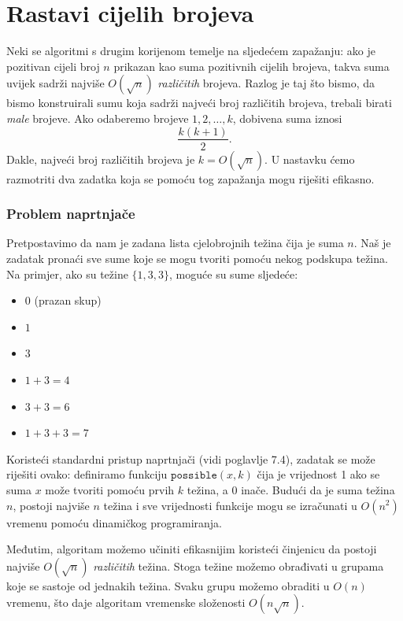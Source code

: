 \section{Rastavi cijelih brojeva}

Neki se algoritmi s drugim korijenom temelje na
sljedećem zapažanju:
ako je pozitivan cijeli broj $n$ prikazan kao
suma pozitivnih cijelih brojeva,
takva suma uvijek sadrži najviše
$O(\sqrt n)$ \emph{različitih} brojeva.
Razlog je taj što bismo, da bismo konstruirali
sumu koja sadrži najveći broj različitih
brojeva, trebali birati \emph{male} brojeve.
Ako odaberemo brojeve $1,2,\ldots,k$,
dobivena suma iznosi
\[\frac{k(k+1)}{2}.\]
Dakle, najveći broj različitih brojeva je $k = O(\sqrt n)$.
U nastavku ćemo razmotriti dva zadatka koja se pomoću tog
zapažanja mogu riješiti efikasno.

\subsubsection{Problem naprtnjače}

Pretpostavimo da nam je zadana lista cjelobrojnih težina
čija je suma $n$.
Naš je zadatak pronaći sve sume koje se mogu tvoriti
pomoću nekog podskupa težina. Na primjer, ako su težine
$\{1,3,3\}$, moguće su sume sljedeće:

\begin{itemize}[noitemsep]
\item $0$ (prazan skup)
\item $1$
\item $3$
\item $1+3=4$
\item $3+3=6$
\item $1+3+3=7$
\end{itemize}

Koristeći standardni pristup naprtnjači (vidi poglavlje 7.4),
zadatak se može riješiti ovako:
definiramo funkciju $\texttt{possible}(x,k)$ čija je vrijednost 1
ako se suma $x$ može tvoriti pomoću prvih $k$ težina,
a 0 inače.
Budući da je suma težina $n$,
postoji najviše $n$ težina i
sve vrijednosti funkcije mogu se izračunati
u $O(n^2)$ vremenu pomoću dinamičkog programiranja.

Međutim, algoritam možemo učiniti efikasnijim
koristeći činjenicu da postoji najviše $O(\sqrt n)$
\emph{različitih} težina.
Stoga težine možemo obrađivati u grupama
koje se sastoje od jednakih težina.
Svaku grupu možemo obraditi
u $O(n)$ vremenu, što daje algoritam vremenske složenosti $O(n \sqrt n)$.

